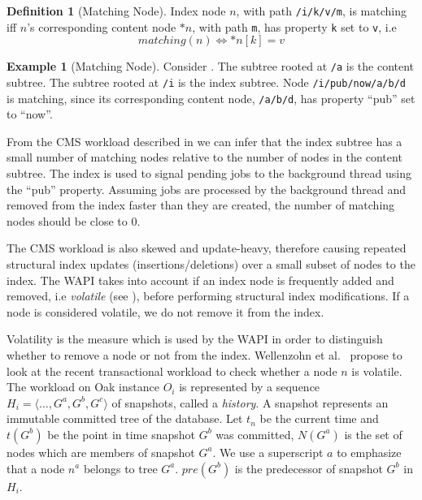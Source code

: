 \documentclass[abstracton,12pt]{scrartcl}
\theoremstyle{definition}
\newtheorem{definition}{Definition}
\newtheorem{example}{Example}
\begin{document}
\begin{definition}[Matching Node]
  Index node $n$, with path \texttt{/i/k/v/m}, is matching
  iff $n$'s corresponding content node $*n$, with path \texttt{m}, has property
  \texttt{k} set to \texttt{v}, i.e
  $$ matching(n) \iff *n[k] = v $$
  \label{def:matching_node}
\end{definition}

\begin{example}[Matching Node]
  Consider . The subtree rooted at \texttt{/a} is
  the content subtree. The subtree rooted at \texttt{/i} is the index
  subtree. Node \texttt{/i/pub/now/a/b/d} is matching, since its corresponding
  content node, \texttt{/a/b/d}, has property ``pub'' set to ``now''.
\end{example}

From the CMS workload described in  we can infer that the index subtree has a small number of
matching nodes relative to the number of nodes in the content subtree. The index is
 used to signal pending jobs to the background thread using
the ``pub'' property. Assuming jobs are processed by
the background thread and removed from the index faster than they are created,
the number of matching nodes should be close to $0$.  

The CMS workload is also skewed and update-heavy, therefore causing repeated structural index
updates (insertions/deletions) over a small subset of nodes to the index.
The WAPI takes into account if an index node is frequently added and removed,
i.e \textit{volatile} (see ), before performing structural
index modifications. If a node is considered volatile, we do not remove it from the index.

Volatility is the measure which is used by the WAPI in order to distinguish
whether to remove a node or not from the index.
Wellenzohn et al.~\cite{KW17} propose to look at the recent transactional
workload to check whether a node $n$ is volatile. The workload on Oak instance
$O_i$ is represented by a sequence $H_i = \langle \ldots, G^a, G^b, G^c
\rangle$ of snapshots, called a \textit{history}. A snapshot represents an immutable
committed tree of the database. Let $t_n$ be the current time and
$t(G^b)$ be the point in time snapshot $G^b$ was committed, $N(G^a)$ is the
set of nodes which are members of snapshot $G^a$. We use a superscript $a$
to emphasize that a node $n^a$ belongs to tree $G^a$. $pre(G^b)$ is the
predecessor of snapshot $G^b$ in $H_i$.
\end{document}

